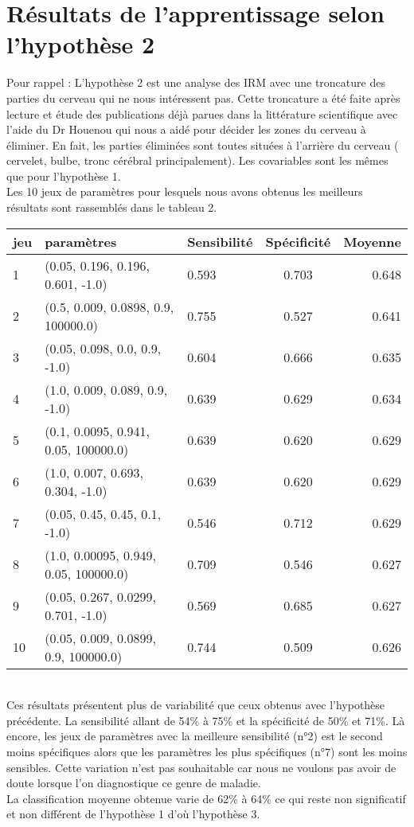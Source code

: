 \section{Résultats de l'apprentissage selon l'hypothèse 2 }

Pour rappel : L'hypothèse 2 est une analyse des IRM avec une troncature des parties du cerveau qui ne nous intéressent pas. Cette troncature a été faite après lecture et étude des publications déjà parues dans la littérature scientifique avec l'aide du Dr Houenou qui nous a aidé pour décider les zones du cerveau à éliminer. 
En fait, les parties éliminées sont toutes situées à l'arrière du cerveau ( cervelet, bulbe, tronc cérébral principalement). 
Les covariables sont les mêmes que pour l'hypothèse 1.
\\
Les 10 jeux de paramètres pour lesquels nous avons obtenus les meilleurs résultats sont rassemblés dans le tableau 2.

\begin{tabular}{|l|l|l|c|r|}
	\hline
	jeu & paramètres & Sensibilité & Spécificité & Moyenne \\
	\hline
	1 & (0.05, 0.196, 0.196, 0.601, -1.0) & 0.593 & 0.703 & 0.648 \\
	2 & (0.5, 0.009, 0.0898, 0.9, 100000.0) & 0.755 & 0.527 & 0.641 \\
	3 & (0.05, 0.098, 0.0, 0.9, -1.0) & 0.604 & 0.666 & 0.635 \\
	4 & (1.0, 0.009, 0.089, 0.9, -1.0) & 0.639 & 0.629 & 0.634 \\
	5 & (0.1, 0.0095, 0.941, 0.05, 100000.0) & 0.639 & 0.620 & 0.629 \\
	6 & (1.0, 0.007, 0.693, 0.304, -1.0) & 0.639 & 0.620 & 0.629 \\
	7 & (0.05, 0.45, 0.45, 0.1, -1.0) & 0.546 & 0.712 & 0.629 \\
	8 & (1.0, 0.00095, 0.949, 0.05, 100000.0) & 0.709 & 0.546 & 0.627 \\
	9 & (0.05, 0.267, 0.0299, 0.701, -1.0) & 0.569 & 0.685 & 0.627 \\
	10 & (0.05, 0.009, 0.0899, 0.9, 100000.0) & 0.744 & 0.509 & 0.626 \\
	\hline
	
\end{tabular}
\\
Ces résultats présentent plus de variabilité que ceux obtenus avec l'hypothèse précédente.
La sensibilité allant de 54\% à 75\% et la spécificité de 50\% et 71\%. Là encore, les jeux de paramètres avec la meilleure sensibilité (n°2) est le second moins spécifiques alors que les paramètres les plus spécifiques (n°7)
sont les moins sensibles.  
Cette variation n'est pas souhaitable car nous ne voulons pas avoir de doute lorsque l'on diagnostique ce genre de maladie. 
\\
La classification moyenne obtenue varie de 62\% à 64\% ce qui reste non significatif et non différent de l'hypothèse 1 d'où l'hypothèse 3.  


